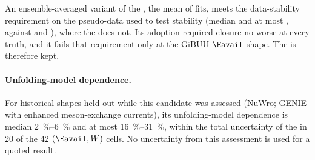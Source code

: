 An ensemble-averaged variant of the \estMultiD{}, the mean of  fits, meets the data-stability requirement on the pseudo-data used to test stability (median  and at most , against  and ), where the \estMultiD{} does not. Its adoption required closure no worse at every truth, and it fails that requirement only at the GiBUU $\Eavail$ shape. The \estMultiD{} is therefore kept.

\paragraph{Unfolding-model dependence.}

For historical shapes held out while this candidate was assessed (NuWro; GENIE with enhanced meson-exchange currents), its unfolding-model dependence is median \SIrange{2}{6}{\percent} and at most \SIrange{16}{31}{\percent}, within the total uncertainty of the \resFiveAxis{} in 20 of the 42 $(\Eavail,W)$ cells. No uncertainty from this assessment is used for a quoted result.

